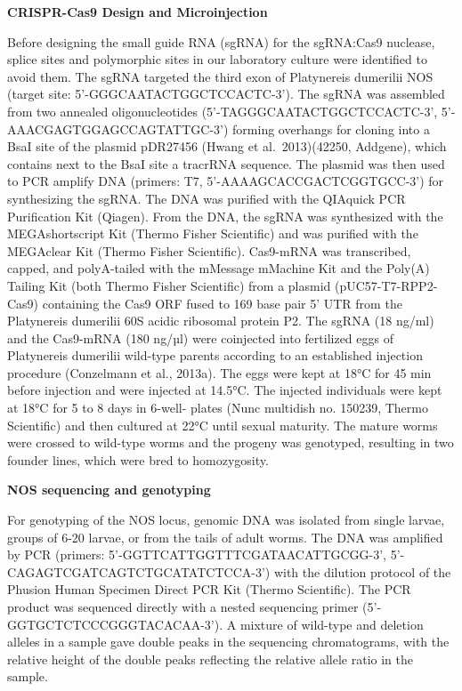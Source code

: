 \documentclass[
  10pt,
  onecolumn]{article}
\begin{document}
\textbf{CRISPR-Cas9 Design and Microinjection}

Before designing the small guide RNA (sgRNA) for the sgRNA:Cas9
nuclease, splice sites and polymorphic sites in our laboratory culture
were identified to avoid them. The sgRNA targeted the third exon of
Platynereis dumerilii NOS (target site: 5'-GGGCAATACTGGCTCCACTC-3'). The
sgRNA was assembled from two annealed oligonucleotides
(5'-TAGGGCAATACTGGCTCCACTC-3', 5'-AAACGAGTGGAGCCAGTATTGC-3') forming
overhangs for cloning into a BsaI site of the plasmid pDR27456 (Hwang et
al.~2013)(42250, Addgene), which contains next to the BsaI site a
tracrRNA sequence. The plasmid was then used to PCR amplify DNA
(primers: T7, 5'-AAAAGCACCGACTCGGTGCC-3') for synthesizing the sgRNA.
The DNA was purified with the QIAquick PCR Purification Kit (Qiagen).
From the DNA, the sgRNA was synthesized with the MEGAshortscript Kit
(Thermo Fisher Scientific) and was purified with the MEGAclear Kit
(Thermo Fisher Scientific). Cas9-mRNA was transcribed, capped, and
polyA-tailed with the mMessage mMachine Kit and the Poly(A) Tailing Kit
(both Thermo Fisher Scientific) from a plasmid (pUC57-T7-RPP2-Cas9)
containing the Cas9 ORF fused to 169 base pair 5' UTR from the
Platynereis dumerilii 60S acidic ribosomal protein P2. The sgRNA (18
ng/ml) and the Cas9-mRNA (180 ng/µl) were coinjected into fertilized
eggs of Platynereis dumerilii wild-type parents according to an
established injection procedure (Conzelmann et al., 2013a). The eggs
were kept at 18°C for 45 min before injection and were injected at
14.5°C. The injected individuals were kept at 18°C for 5 to 8 days in
6-well- plates (Nunc multidish no. 150239, Thermo Scientific) and then
cultured at 22°C until sexual maturity. The mature worms were crossed to
wild-type worms and the progeny was genotyped, resulting in two founder
lines, which were bred to homozygosity.

\textbf{NOS sequencing and genotyping}

For genotyping of the NOS locus, genomic DNA was isolated from single
larvae, groups of 6-20 larvae, or from the tails of adult worms. The DNA
was amplified by PCR (primers: 5'-GGTTCATTGGTTTCGATAACATTGCGG-3',
5'-CAGAGTCGATCAGTCTGCATATCTCCA-3') with the dilution protocol of the
Phusion Human Specimen Direct PCR Kit (Thermo Scientific). The PCR
product was sequenced directly with a nested sequencing primer
(5'-GGTGCTCTCCCGGGTACACAA-3'). A mixture of wild-type and deletion
alleles in a sample gave double peaks in the sequencing chromatograms,
with the relative height of the double peaks reflecting the relative
allele ratio in the sample.
\end{document}
